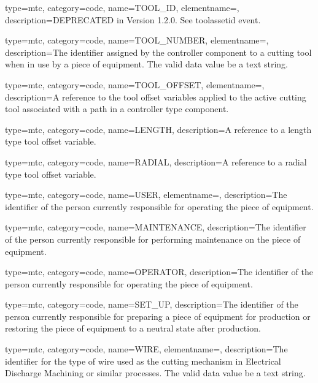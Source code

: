 {
  type=mtc,
  category=code,
  name={TOOL\_ID},
  elementname=,
  description={DEPRECATED in Version 1.2.0.   See \gls{toolassetid event}. }
}

{
  type=mtc,
  category=code,
  name={TOOL\_NUMBER},
  elementname=,
  description={The identifier assigned by the \gls{controller} component to a cutting tool when in use by a piece of equipment. \newline The \gls{valid data value} \must be a text string.}
}

{
  type=mtc,
  category=code,
  name={TOOL\_OFFSET},
  elementname=,
  description={A reference to the tool offset variables applied to the active cutting tool associated with a \gls{path} in a \gls{controller} type component.}
}

{
  type=mtc,
  category=code,
  name={LENGTH},
  description={A reference to a length type tool offset variable.}
}

{
  type=mtc,
  category=code,
  name={RADIAL},
  description={A reference to a radial type tool offset variable.}
}

{
  type=mtc,
  category=code,
  name={USER},
  elementname=,
  description={The identifier of the person currently responsible for operating the piece of equipment.}
}

{
  type=mtc,
  category=code,
  name={MAINTENANCE},
  description={The identifier of the person currently responsible for performing maintenance on the piece of equipment.}
}

{
  type=mtc,
  category=code,
  name={OPERATOR},
  description={The identifier of the person currently responsible for operating the piece of equipment.}
}

{
  type=mtc,
  category=code,
  name={SET\_UP},
  description={The identifier of the person currently responsible for preparing a piece of equipment for production or restoring the piece of equipment to a neutral state after production.}
}

{
  type=mtc,
  category=code,
  name={WIRE},
  elementname=,
  description={The identifier for the type of wire used as the cutting mechanism in Electrical Discharge Machining or similar processes. \newline The \gls{valid data value} \must be a text string.}
}

